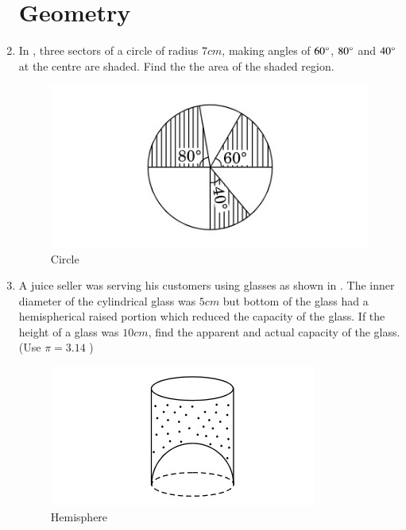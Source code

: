 \documentclass[2pt,-letter paper]{article}
\begin{document}
\begin{enumerate}
\section{Geometry}

\item In , three sectors of a circle of radius $7cm$, making angles of $60\degree$,
$80\degree$ and $40\degree$ at the centre are shaded. Find the the area of the shaded region.
\begin{figure}[H]
    \centering
    \includegraphics[width=\columnwidth]{figures/Figure_2.png}
    \caption{Circle}
    \label{fig:Fig-2}
\end{figure}

\item A juice seller was serving his customers using glasses as shown in  . The inner diameter of the cylindrical glass was $5 cm$ but bottom of the glass had a hemispherical raised portion which reduced the capacity of the glass. If the height of a glass was $10 cm$, find the apparent and actual capacity of the glass. (Use $\pi = 3.14$ )
\begin{figure}[H]
    \centering
    \includegraphics[width=\columnwidth]{figures/Figure_3.png}
    \caption{Hemisphere}
    

\end{figure}
\end{enumerate}
\end{document}
